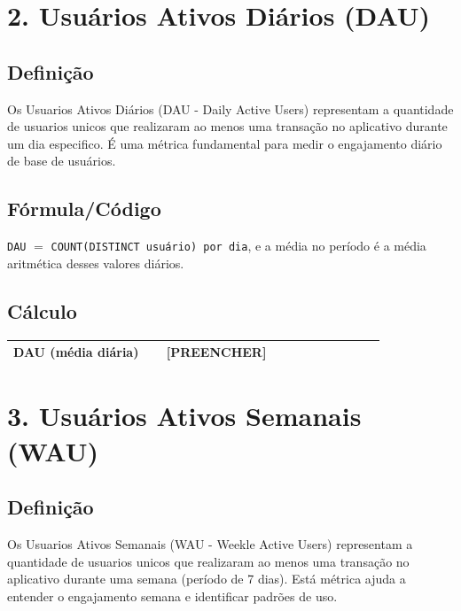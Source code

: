 \documentclass[12pt]{article}
\providecommand{\DAUmedio}{[PREENCHER]}
\begin{document}
\section*{2. Usuários Ativos Diários (DAU)}
\subsection*{Definição}
Os Usuarios Ativos Diários (DAU - Daily Active Users) representam a quantidade de usuarios unicos que realizaram ao menos uma transação no aplicativo durante um dia especifico. É uma métrica fundamental para medir o engajamento diário de base de usuários.

\subsection*{Fórmula/Código}
\noindent \texttt{DAU} $=$ \texttt{COUNT(DISTINCT usuário) por dia}, e a média no período é a média aritmética desses valores diários.

\subsection*{Cálculo}
\begin{center}
\begin{tabular}{>{\bfseries}p{0.37\linewidth} p{0.53\linewidth}}
\toprule
DAU (média diária) & \DAUmedio \\
\bottomrule
\end{tabular}
\end{center}

\section*{3. Usuários Ativos Semanais (WAU)}
\subsection*{Definição}
Os Usuarios Ativos Semanais (WAU - Weekle Active Users) representam a quantidade de usuarios unicos que realizaram ao menos uma transação no aplicativo durante uma semana (período de 7 dias). Está métrica ajuda a entender o engajamento semana e identificar padrões de uso.
\end{document}
